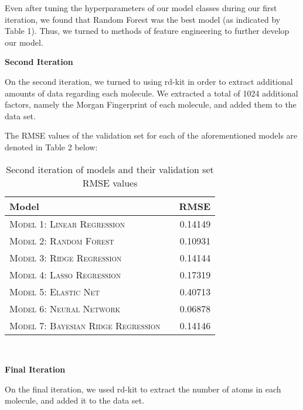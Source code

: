 \documentclass[11pt]{article}
\begin{document}
Even after tuning the hyperparameters of our model classes during our first iteration, we found that Random Forest was the best model (as indicated by Table 1). Thus, we turned to methods of feature engineering to further develop our model. \\

 \begin{center}
      \textbf{Second Iteration}
 \end{center}

On the second iteration, we turned to using rd-kit in order to extract additional amounts of data regarding each molecule. We extracted a total of 1024 additional factors, namely the Morgan Fingerprint of each molecule, and added them to the data set.

The RMSE values of the validation set for each of the aforementioned models are denoted in Table 2 below:
  \begin{table}[h!]
    \centering
    \begin{tabular}{llr}
     \toprule
     Model &  & RMSE \\
     \midrule
     \textsc{Model 1: Linear Regression} & & 0.14149 \\
     \textsc{Model 2: Random Forest} & & 0.10931 \\
     \textsc{Model 3: Ridge Regression}  & & 0.14144 \\
     \textsc{Model 4: Lasso Regression} & & 0.17319 \\
     \textsc{Model 5: Elastic Net} & & 0.40713 \\
     \textsc{Model 6: Neural Network} & & 0.06878 \\
     \textsc{Model 7: Bayesian Ridge Regression} & & 0.14146 \\
     \bottomrule
    \end{tabular}
    \caption{Second iteration of models and their validation set RMSE values}
  \end{table}
 \\
 \begin{center}
      \textbf{Final Iteration}
 \end{center}
  
On the final iteration, we used rd-kit to extract the number of atoms in each molecule, and added it to the data set.
\end{document}
